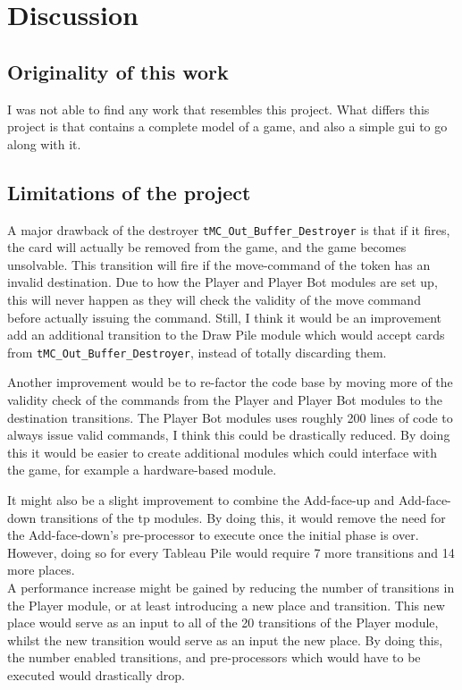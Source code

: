 \documentclass[runningheads,a4paper]{llncs}
\begin{document}
\section{Discussion}
\subsection{Originality of this work}
I was not able to find any work that resembles this project. What differs this project is that contains a complete model of a game, and also a simple \ac{gui} to go along with it.
\subsection{Limitations of the project}
\label{sec5:limitations}
A major drawback of the destroyer \verb!tMC_Out_Buffer_Destroyer! is that if it fires, the card will actually be removed from the game, and the game becomes unsolvable. This transition will fire if the move-command of the token has an invalid destination. Due to how the Player and Player Bot modules are set up, this will never happen as they will check the validity of the move command before actually issuing the command. Still, I think it would be an improvement add an additional transition to the Draw Pile module which would accept cards from \verb!tMC_Out_Buffer_Destroyer!, instead of totally discarding them.
\newline

Another improvement would be to re-factor the code base by moving more of the validity check of the commands from the Player and Player Bot modules to the destination transitions. The Player Bot modules uses roughly 200 lines of code to always issue valid commands, I think this could be drastically reduced. By doing this it would be easier to create additional modules which could interface with the game, for example a hardware-based module.
\newline

It might also be a slight improvement to combine the Add-face-up and Add-face-down transitions of the \ac{tp} modules. By doing this, it would remove the need for the Add-face-down's pre-processor to execute once the initial phase is over. However, doing so for every Tableau Pile would require 7 more transitions and 14 more places. \\

A performance increase might be gained by reducing the number of transitions in the Player module, or at least introducing a new place and transition. This new place would serve as an input to all of the 20 transitions of the Player module, whilst the new transition would serve as an input the new place. By doing this, the number enabled transitions, and pre-processors which would have to be executed would drastically drop.\\
\end{document}
